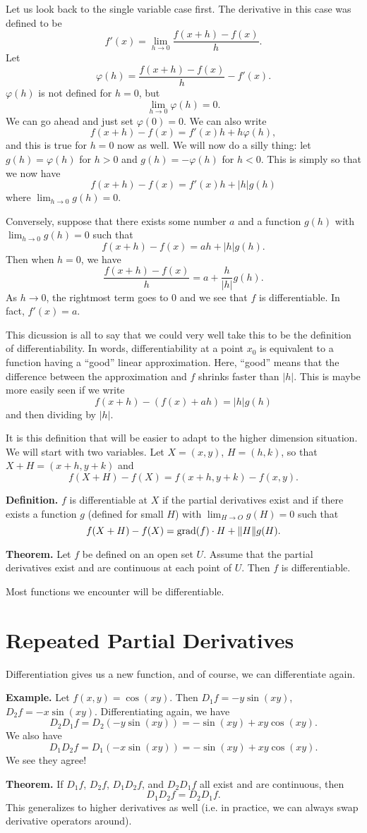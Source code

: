 \documentclass{article}
\DeclareMathOperator{\grd}{grad}
\begin{document}
Let us look back to the single variable case first. The derivative
in this case was defined to be
\[f'(x) = \lim_{h \to 0} \frac{f(x+h) - f(x)}{h}.\]
Let 
\[\varphi(h) = \frac{f(x+h) - f(x)}{h} - f'(x).\]
$\varphi(h)$ is not defined for $h=0$, but 
\[\lim_{h \to 0} \varphi(h) = 0.\]
We can go ahead and just set $\varphi(0)=0$.
We can also write 
\[f(x+h) - f(x) = f'(x)h + h\varphi(h),\]
and this is true for $h=0$ now as well. We will now do a silly thing:
let $g(h) = \varphi(h)$ for $h>0$ and $g(h) = -\varphi(h)$ for $h<0$. This is simply
so that we now have
\[f(x+h) - f(x) = f'(x)h + |h|g(h)\]
where $\lim_{h\to 0} g(h)=0$.

Conversely, suppose that there exists some number $a$ 
and a function $g(h)$ 
with $\lim_{h \to 0} g(h) = 0$ such that
\[f(x+h) - f(x) = ah + |h|g(h).\]
Then when $h=0$, we have
\[\frac{f(x+h)-f(x)}{h} = a + \frac{h}{|h|} g(h).\]
As $h \to 0$, the rightmost term goes to $0$ and we see that $f$
is differentiable. In fact, $f'(x) = a$.


This dicussion is all to say that we could very well take this
to be the definition of differentiability. In words, differentiability
at a point $x_0$ is equivalent to a function having a ``good'' linear approximation.
Here, ``good'' means that the difference between the approximation and $f$
shrinks faster than $|h|$. This is maybe more easily seen if we write
\[f(x+h) - \left( f(x) + ah \right) = |h|g(h)\]
and then dividing by $|h|$.

It is this definition that will be easier to adapt to the higher dimension 
situation. We will start with two variables. Let $X=(x,y)$, $H=(h,k)$,
so that $X+H=(x+h,y+k)$ and 
\[f(X+H)-f(X) = f(x+h,y+k) - f(x,y).\]

\textbf{Definition.} $f$ is differentiable at $X$ if the partial derivatives 
exist and if there exists a function $g$ (defined for small $H$) 
with $\lim_{H \to O} g(H) = 0$ such that
\[f(X+H) - f(X) = \grd(f)\cdot H + \norm{H}g(H).\]

\textbf{Theorem.} Let $f$ be defined on an open set $U$. Assume that
the partial derivatives exist and are continuous at each point of $U$.
Then $f$ is differentiable.

Most functions we encounter will be differentiable.

\section*{Repeated Partial Derivatives}

Differentiation gives us a new function, and of course, we 
can differentiate again.

\textbf{Example.} Let $f(x,y) = \cos(xy)$. 
Then $D_1 f = -y\sin(xy)$, $D_2 f = -x\sin(xy)$.
Differentiating again, we have
\[D_2 D_1 f = D_2 (-y\sin(xy)) = -\sin(xy) + xy \cos(xy).\]
We also have
\[D_1 D_2 f = D_1 (-x\sin(xy)) = -\sin(xy) + xy\cos(xy).\]
We see they agree!

\textbf{Theorem.} If $D_1f$, $D_2 f$, $D_1 D_2 f$, and $D_2 D_1 f$
all exist and are continuous, then 
\[D_1 D_2 f = D_2 D_1 f.\]
This generalizes to higher derivatives as well (i.e. in practice, 
we can always swap derivative operators around).
\end{document}
